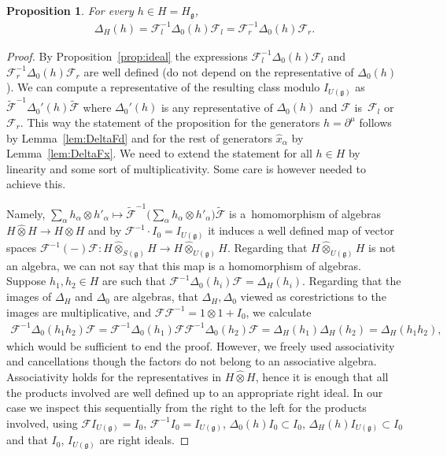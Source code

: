 \documentclass[10pt,a4paper]{amsart}
\def\gg{\mathfrak{g}}
\newtheorem{Proposition}[Theorem]{Proposition}
 { \theoremstyle{definition}
\newtheorem{Definition}[Theorem]{Definition}
\newtheorem{Example}[Theorem]{Example}
\newtheorem{Remark}[Theorem]{Remark} }
\numberwithin{equation}{section}
\begin{document}
\begin{Proposition}\label{prop:FDFm}
For every $h\in H = H_\gg$,
\begin{gather*}
\Delta_H(h) = \mathcal{F}_l^{-1}\Delta_0(h)\mathcal{F}_l = \mathcal{F}_r^{-1}\Delta_0(h)\mathcal{F}_r.
\end{gather*}
\end{Proposition}

\begin{proof} By Proposition~\ref{prop:ideal} the expressions $\mathcal{F}_l^{-1}\Delta_0(h)\mathcal{F}_l$ and $\mathcal{F}_r^{-1}\Delta_0(h)\mathcal{F}_r$ are well defined (do not depend on the representative of $\Delta_0(h)$). We can compute a representative of the resulting class modulo $I_{U(\gg)}$ as $\tilde{\mathcal{F}}^{-1}\Delta_0'(h)\tilde{\mathcal{F}}$ where $\Delta_0'(h)$ is any representative of $\Delta_0(h)$ and $\mathcal{F}$ is~$\mathcal{F}_l$ or~$\mathcal{F}_r$. This way the statement of the proposition for the generators $h = \partial^\mu$ follows by Lemma~\ref{lem:DeltaFd} and for the rest of generators $\hat{x}_\alpha$ by Lemma~\ref{lem:DeltaFx}. We need to extend the statement for all $h\in H$ by linearity and some sort of multiplicativity. Some care is however needed to achieve this.

Namely, $\sum_\alpha h_\alpha\otimes h'_\alpha \mapsto\tilde{\mathcal{F}}^{-1} \big(\sum_\alpha h_\alpha\otimes h'_\alpha\big) \tilde{\mathcal{F}}$ is a~homomorphism of algebras $H\hat\otimes H\to H\hat\otimes H$ and by $\mathcal{F}^{-1}\cdot I_0 = I_{U(\gg)}$ it induces a well defined map of vector spaces $\mathcal{F}^{-1} (-)\mathcal{F}\colon H\hat\otimes_{S(\gg)}H\to H\hat\otimes_{U(\gg)} H$. Regarding that $H\hat\otimes_{U(\gg)} H$ is not an algebra, we can not say that this map is a homomorphism of algebras. Suppose $h_1,h_2\in H$ are such that $\mathcal{F}^{-1}\Delta_0(h_i)\mathcal{F}=\Delta_H(h_i)$. Regarding that the images of $\Delta_H$ and $\Delta_0$ are algebras, that $\Delta_H, \Delta_0$ viewed as corestrictions to the images are multiplicative, and $\mathcal{F}\mathcal{F}^{-1} = 1\otimes 1 + I_0$, we calculate
\begin{gather*}\mathcal{F}^{-1}\Delta_0(h_1 h_2)\mathcal{F}=
\mathcal{F}^{-1}\Delta_0(h_1)\mathcal{F}\mathcal{F}^{-1}\Delta_0(h_2)\mathcal{F}=
\Delta_H(h_1)\Delta_H(h_2) = \Delta_H(h_1 h_2),\end{gather*}
which would be sufficient to end the proof. However, we freely used associativity and cancellations though the factors do not belong to an associative algebra. Associativity holds for the representatives in $H\hat\otimes H$, hence it is enough that all the products involved are well defined up to an appropriate right ideal. In our case we inspect this sequentially from the right to the left for the products involved, using $\mathcal{F} I_{U(\gg)} = I_0$, $\mathcal{F}^{-1} I_0 = I_{U(\gg)}$, $\Delta_0(h) I_0 \subset I_0$, $\Delta_H(h) I_{U(\gg)} \subset I_0$ and that $I_0$, $I_{U(\gg)}$ are right ideals.
\end{proof}
\end{document}

